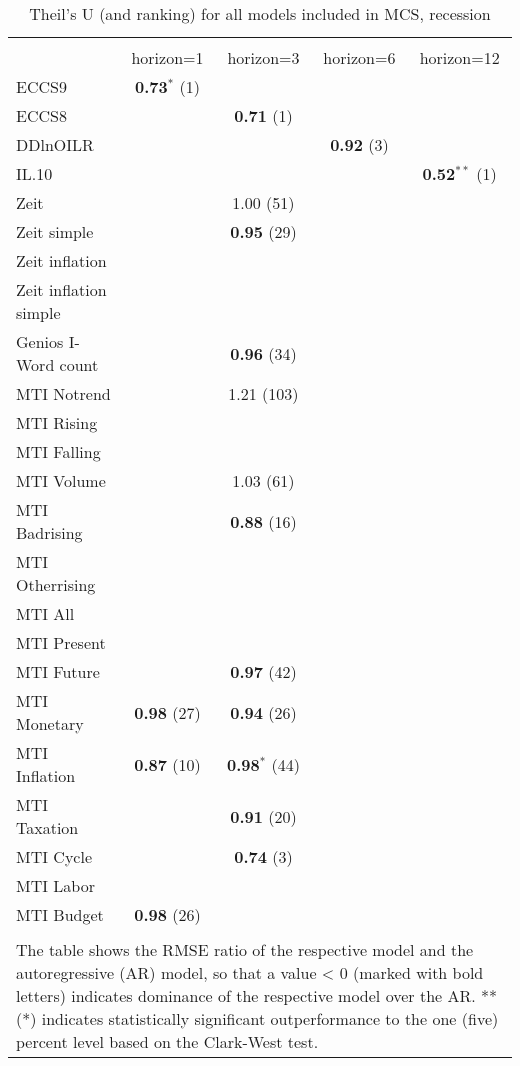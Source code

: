 
\begin{table}[!htbp] \centering 
  \caption{Theil's U (and ranking) for all models included in MCS, recession} 
  \label{} 
\scriptsize 
\begin{tabular}{@{\extracolsep{5pt}} lcccc} 
\\[-1.8ex]\hline 
\hline \\[-1.8ex] 
 & horizon=1 & horizon=3 & horizon=6 & horizon=12 \\ 
ECCS9 & \textbf{0.73$^{*}$} (1) &  &  &  \\ 
ECCS8 &  & \textbf{0.71} (1) &  &  \\ 
DDlnOILR &  &  & \textbf{0.92} (3) &  \\ 
IL.10 &  &  &  & \textbf{0.52$^{**}$} (1) \\ 
Zeit &  & 1.00 (51) &  &  \\ 
Zeit simple &  & \textbf{0.95} (29) &  &  \\ 
Zeit inflation &  &  &  &  \\ 
Zeit inflation simple &  &  &  &  \\ 
Genios I-Word count &  & \textbf{0.96} (34) &  &  \\ 
MTI Notrend &  & 1.21 (103) &  &  \\ 
MTI Rising &  &  &  &  \\ 
MTI Falling &  &  &  &  \\ 
MTI Volume &  & 1.03 (61) &  &  \\ 
MTI Badrising &  & \textbf{0.88} (16) &  &  \\ 
MTI Otherrising &  &  &  &  \\ 
MTI All &  &  &  &  \\ 
MTI Present &  &  &  &  \\ 
MTI Future &  & \textbf{0.97} (42) &  &  \\ 
MTI Monetary & \textbf{0.98} (27) & \textbf{0.94} (26) &  &  \\ 
MTI Inflation & \textbf{0.87} (10) & \textbf{0.98$^{*}$} (44) &  &  \\ 
MTI Taxation &  & \textbf{0.91} (20) &  &  \\ 
MTI Cycle &  & \textbf{0.74} (3) &  &  \\ 
MTI Labor &  &  &  &  \\ 
MTI Budget & \textbf{0.98} (26) &  &  &  \\ 
\hline \\[-1.8ex] 
\multicolumn{5}{l}{The table shows the RMSE ratio of the 
              respective model and the autoregressive (AR) model,
              so that a value < 0 (marked with bold letters) 
              indicates dominance of the respective model over 
              the AR. ** (*) indicates 
              statistically significant outperformance 
              to the one (five) percent level based on the Clark-West test.} \\ 
\end{tabular} 
\end{table} 
